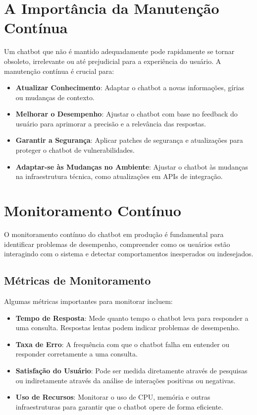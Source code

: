 \documentclass[14pt,a4paper,oneside]{book}
\begin{document}
\section{A Importância da Manutenção Contínua}

Um chatbot que não é mantido adequadamente pode rapidamente se tornar obsoleto, irrelevante ou até prejudicial para a experiência do usuário. A manutenção contínua é crucial para:

\begin{itemize}
	\item \textbf{Atualizar Conhecimento}: Adaptar o chatbot a novas informações, gírias ou mudanças de contexto.
	\item \textbf{Melhorar o Desempenho}: Ajustar o chatbot com base no feedback do usuário para aprimorar a precisão e a relevância das respostas.
	\item \textbf{Garantir a Segurança}: Aplicar patches de segurança e atualizações para proteger o chatbot de vulnerabilidades.
	\item \textbf{Adaptar-se às Mudanças no Ambiente}: Ajustar o chatbot às mudanças na infraestrutura técnica, como atualizações em APIs de integração.
\end{itemize}

\section{Monitoramento Contínuo}

O monitoramento contínuo do chatbot em produção é fundamental para identificar problemas de desempenho, compreender como os usuários estão interagindo com o sistema e detectar comportamentos inesperados ou indesejados.

\subsection{Métricas de Monitoramento}

Algumas métricas importantes para monitorar incluem:

\begin{itemize}
	\item \textbf{Tempo de Resposta}: Mede quanto tempo o chatbot leva para responder a uma consulta. Respostas lentas podem indicar problemas de desempenho.
	\item \textbf{Taxa de Erro}: A frequência com que o chatbot falha em entender ou responder corretamente a uma consulta.
	\item \textbf{Satisfação do Usuário}: Pode ser medida diretamente através de pesquisas ou indiretamente através da análise de interações positivas ou negativas.
	\item \textbf{Uso de Recursos}: Monitorar o uso de CPU, memória e outras infraestruturas para garantir que o chatbot opere de forma eficiente.
\end{itemize}
\end{document}
